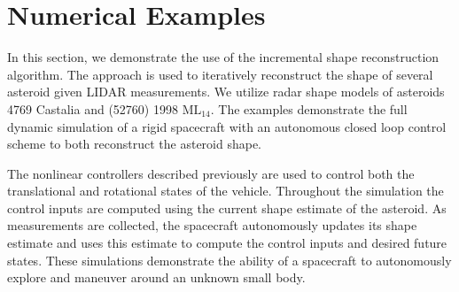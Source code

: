 \documentclass[journal]{new-aiaa}
\begin{document}
\section{Numerical Examples}\label{sec:reconstruction_examples}

In this section, we demonstrate the use of the incremental shape reconstruction algorithm.
The approach is used to iteratively reconstruct the shape of several asteroid given LIDAR measurements.
We utilize radar shape models of asteroids \num{4769} Castalia and (\num{52760}) \num{1998} \(\text{ML}_{14}\).
The examples demonstrate the full dynamic simulation of a rigid spacecraft with an autonomous closed loop control scheme to both reconstruct the asteroid shape.

The nonlinear controllers described previously are used to control both the translational and rotational states of the vehicle.
Throughout the simulation the control inputs are computed using the current shape estimate of the asteroid. 
As measurements are collected, the spacecraft autonomously updates its shape estimate and uses this estimate to compute the control inputs and desired future states.
These simulations demonstrate the ability of a spacecraft to autonomously explore and maneuver around an unknown small body.
\end{document}
